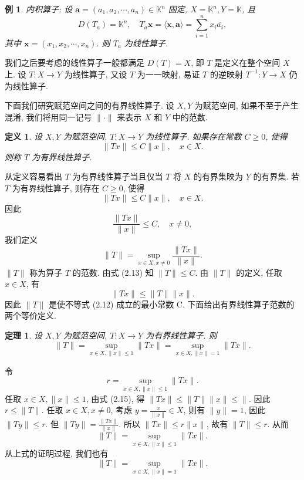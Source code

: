 \documentclass[openany]{ctexbook}
\makeatletter
\theoremstyle{kaiti}
\newtheorem{definition}{定义}[section]
\newtheorem{theorem}{定理}[section]
\theoremstyle{normal}
\newtheorem{example}{例}[section]
\renewenvironment{proof}[1][\proofname]{\par
    \pushQED{\qed}%
    \normalfont \topsep6\p@\@plus6\p@\relax
    \trivlist
    \item\relax
    {\heiti #1}\hspace{2\labelsep}\ignorespaces
  }{%
    \popQED\endtrivlist\@endpefalse
  }
\makeatother
\begin{document}
\begin{example}
内积算子: 设 $\boldsymbol{a}=\left(a_1, a_2, \cdots, a_n\right) \in \mathbb{K}^n$ 固定, $X=\mathbb{K}^n, Y=\mathbb{K}$, 且
$$
D\left(T_{a}\right)=\mathbb{K}^n, \quad T_{a} \boldsymbol{x}=\langle\boldsymbol{x}, \boldsymbol{a}\rangle=\sum_{i=1}^n x_{i} \overline{a_{i}},
$$
其中 $\boldsymbol{x}=\left(x_1, x_2, \cdots, x_n\right)$. 则 $T_{a}$ 为线性算子.
\end{example}

我们之后要考虑的线性算子一般都满足 $D(T)=X$, 即 $T$ 是定义在整个空间 $X$ 上. 设 $T: X \rightarrow Y$ 为线性算子, 又设 $T$ 为一一映射, 易证 $T$ 的逆映射 $T^{-1}: Y \rightarrow X$ 仍为线性算子.

下面我们研究赋范空间之间的有界线性算子. 设 $X, Y$ 为赋范空间, 如果不至于产生混淆, 我们将用同一记号 $\|\cdot\|$ 来表示 $X$ 和 $Y$ 中的范数.

\begin{definition}
设 $X, Y$ 为赋范空间, $T: X \rightarrow Y$ 为线性算子. 如果存在常数 $C \geqslant 0$, 使得
$$
\|Tx\| \leqslant C\|x\|, \quad x \in X.
$$
则称 $T$ 为有界线性算子.
\end{definition}

从定义容易看出 $T$ 为有界线性算子当且仅当 $T$ 将 $X$ 的有界集映为 $Y$ 的有界集. 若 $T$ 为有界线性算子, 则存在 $C \geqslant 0$, 使得
\begin{equation}
  \|T x\| \leqslant C\|x\|, \quad x \in X.
\end{equation}
因此
\begin{equation}
  \frac{\|T x\|}{\|x\|} \leqslant C, \quad x \neq 0,
\end{equation}
我们定义
\begin{equation}
  \|T\|=\sup_{x \in X, x \neq 0} \frac{\|T x\|}{\|x\|}.
\end{equation}
$\|T\|$ 称为算子 $T$ 的范数. 由式 (2.13) 知 $\|T\| \leqslant C$. 由 $\|T\|$ 的定义, 任取 $x \in X$, 有
\begin{equation}
  \|T x\| \leqslant\|T\|\|x\|.
\end{equation}
因此 $\|T\|$ 是使不等式 (2.12) 成立的最小常数 C. 下面给出有界线性算子范数的两个等价定义.

\begin{theorem}
设 $X, Y$ 为赋范空间, $T: X \rightarrow Y$ 为有界线性算子. 则
$$
\|T\|=\sup_{x \in X,\|x\| \leqslant 1}\|T x\|=\sup_{x \in X,\|x\|=1}\|T x\|.
$$
\end{theorem}

\begin{proof}
令
$$
r=\sup_{x \in X,\|x\| \leqslant 1}\|T x\|.
$$
任取 $x \in X,\|x\| \leqslant 1$, 由式 (2.15), 得
$\|T x\| \leqslant\|T\|\|x\| \leqslant \|.$
因此 $r \leqslant\|T\|$.
任取 $x \in X, x \neq 0$, 考虑 $y=\frac{x}{\|x\|} \in X$, 则有 $\|y\|=1$, 因此 $\|T y\| \leqslant r$. 但 $\|T y\|=\frac{\|T x\|}{\|x\|}$. 所以 $\|T x\| \leqslant r\|x\|$, 故有 $\|T\| \leqslant r$. 从而
$$
\|T\|=\sup_{x \in X,\|x\| \leqslant 1}\|T x\|.
$$
从上式的证明过程, 我们也有
$$
\|T\|=\sup_{x \in X,\|x\|=1}\|T x\|.
$$
\end{proof}
\end{document}
